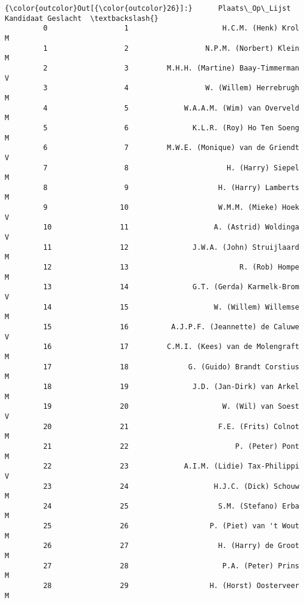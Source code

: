 \documentclass{article}
\begin{document}
            \begin{Verbatim}[commandchars=\\\{\}]
{\color{outcolor}Out[{\color{outcolor}26}]:}      Plaats\_Op\_Lijst                               Kandidaat Geslacht  \textbackslash{}
         0                  1                      H.C.M. (Henk) Krol        M   
         1                  2                  N.P.M. (Norbert) Klein        M   
         2                  3         M.H.H. (Martine) Baay-Timmerman        V   
         3                  4                  W. (Willem) Herrebrugh        M   
         4                  5             W.A.A.M. (Wim) van Overveld        M   
         5                  6               K.L.R. (Roy) Ho Ten Soeng        M   
         6                  7         M.W.E. (Monique) van de Griendt        V   
         7                  8                       H. (Harry) Siepel        M   
         8                  9                     H. (Harry) Lamberts        M   
         9                 10                     W.M.M. (Mieke) Hoek        V   
         10                11                    A. (Astrid) Woldinga        V   
         11                12               J.W.A. (John) Struijlaard        M   
         12                13                          R. (Rob) Hompe        M   
         13                14               G.T. (Gerda) Karmelk-Brom        V   
         14                15                    W. (Willem) Willemse        M   
         15                16          A.J.P.F. (Jeannette) de Caluwe        V   
         16                17         C.M.I. (Kees) van de Molengraft        M   
         17                18              G. (Guido) Brandt Corstius        M   
         18                19               J.D. (Jan-Dirk) van Arkel        M   
         19                20                      W. (Wil) van Soest        V   
         20                21                     F.E. (Frits) Colnot        M   
         21                22                         P. (Peter) Pont        M   
         22                23             A.I.M. (Lidie) Tax-Philippi        V   
         23                24                    H.J.C. (Dick) Schouw        M   
         24                25                     S.M. (Stefano) Erba        M   
         25                26                   P. (Piet) van 't Wout        M   
         26                27                     H. (Harry) de Groot        M   
         27                28                      P.A. (Peter) Prins        M   
         28                29                   H. (Horst) Oosterveer        M   

\end{Verbatim}
\end{document}
